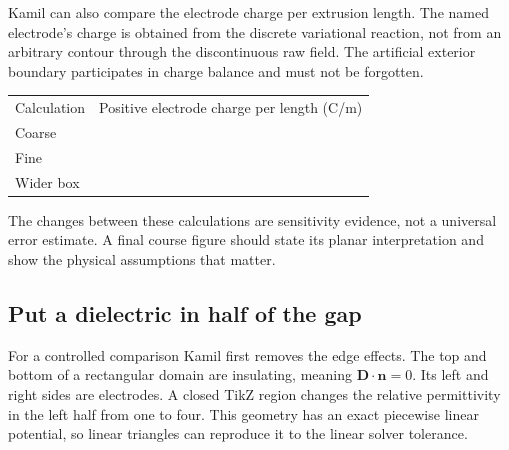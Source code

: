 \begin{codeexample}[width=0pt]
\end{codeexample}

Kamil can also compare the electrode charge per extrusion length. The named
electrode's charge is obtained from the discrete variational reaction, not
from an arbitrary contour through the discontinuous raw field. The artificial
exterior boundary participates in charge balance and must not be forgotten.

\begin{codeexample}[width=0pt]
\begin{tabular}{lr}
Calculation & Positive electrode charge per length (C/m)\\
Coarse & \femmelectricvalue[model=fe coarse,electrode=positive,
  quantity=charge per length]\\
Fine & \femmelectricvalue[model=fe fine,electrode=positive,
  quantity=charge per length]\\
Wider box & \femmelectricvalue[model=fe wide,electrode=positive,
  quantity=charge per length]
\end{tabular}
\end{codeexample}

The changes between these calculations are sensitivity evidence, not a
universal error estimate. A final course figure should state its planar
interpretation and show the physical assumptions that matter.

\subsection{Put a dielectric in half of the gap}
For a controlled comparison Kamil first removes the edge effects. The top and
bottom of a rectangular domain are insulating, meaning $\mathbf D\cdot\mathbf n=0$.
Its left and right sides are electrodes. A closed TikZ region changes the
relative permittivity in the left half from one to four. This geometry has an
exact piecewise linear potential, so linear triangles can reproduce it to the
linear solver tolerance.

